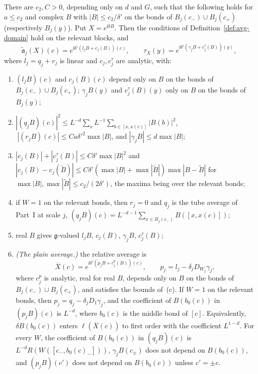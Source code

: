 \begin{lemma}\label{lem:one-step-expansion}
There are $c_2,C>0$, depending only on $d$ and $G$, such that the following holds for $a\le c_2$ and complex $B$ with $|B|\le c_2/\delta'$ on the bonds of $B_j(c_-)\cup B_j(c_+)$ (respectively $B_j(y)$). Put $X=e^{\ii\delta B}$. Then the conditions of Definition~\ref{def:avg-domain} hold on the relevant blocks, and
\[
\tilde{\mathfrak a}_j(X)(c)=e^{\ii\delta'(l_jB+c_j(B))(c)},\qquad \tau_X(y)=e^{\ii\delta'(\gamma_jB+c^\tau_j(B))(y)},
\]
where $l_j=q_j+r_j$ is linear and $c_j,c_j^\tau$ are analytic, with:
\begin{enumerate}[label=(\alph*)]
\item $(l_jB)(c)$ and $c_j(B)(c)$ depend only on $B$ on the bonds of $B_j(c_-)\cup B_j(c_+)$; $\gamma_jB(y)$ and $c^\tau_j(B)(y)$ only on $B$ on the bonds of $B_j(y)$;
\item $|(q_jB)(c)|^2\le L^{-d}\sum_xL^{-1}\sum_{b\in[x,x(c)]}|B(b)|^2$, $\ |(r_jB)(c)|\le Ca\delta'^2\max|B|$, and $|\gamma_jB|\le d\max|B|$;
\item $|c_j(B)|+|c^\tau_j(B)|\le C\delta'\max|B|^2$ and $|c_j(B)-c_j(\tilde B)|\le C\delta'(\max|B|+\max|\tilde B|)\max|B-\tilde B|$ for $\max|B|,\max|\tilde B|\le c_2/(2\delta')$, the maxima being over the relevant bonds;
\item if $W=1$ on the relevant bonds, then $r_j=0$ and $q_j$ is the tube average of Part~I at scale $j$, $(q_jB)(c)=L^{-d-1}\sum_{x\in B_j(c_-)}B([x,x(c)])$;
\item real $B$ gives $\mathfrak g$-valued $l_jB$, $c_j(B)$, $\gamma_jB$, $c_j^\tau(B)$;
\item \emph{(The plain average.)} the relative average is
\[
\overline X(c)=e^{\ii\delta'(p_jB+c^p_j(B))(c)},\qquad p_j=l_j-\delta_jD_{W_j}\gamma_j ,
\]
where $c^p_j$ is analytic, real for real $B$, depends only on $B$ on the bonds of $B_j(c_-)\cup B_j(c_+)$, and satisfies the bounds of~(c). If $W=1$ on the relevant bonds, then $p_j=q_j-\delta_jD_1\gamma_j$, and the coefficient of $B(b_0(c))$ in $(p_jB)(c)$ is $L^{-d}$, where $b_0(c)$ is the middle bond of $[c]$. Equivalently, $\delta B(b_0(c))$ enters $\ell(\overline X(c))$ to first order with the coefficient $L^{1-d}$. For every $W$, the coefficient of $B(b_0(c))$ in $(q_jB)(c)$ is $L^{-d}R(W([c_-,b_0(c)_-]))$, $\gamma_jB(c_\pm)$ does not depend on $B(b_0(c))$, and $(p_jB)(c')$ does not depend on $B(b_0(c))$ unless $c'=\pm c$.
\end{enumerate}
\end{lemma}

